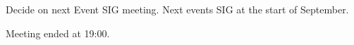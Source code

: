 \documentclass[11pt,hacksoc]{meetingmins}
\begin{document}
\begin{items}
  \item {Decide on next Event SIG meeting.}
  \subitem Next events SIG at the start of September.

  \item {Meeting ended at 19:00.}

\end{items}



\vspace{1em}
\end{document}
